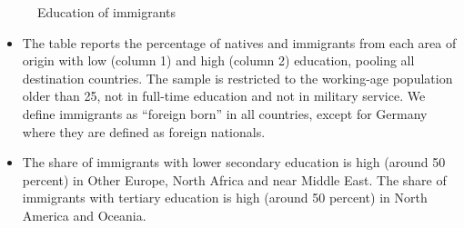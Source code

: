 \begin{itemize}
\begin{figure}[H]
                \caption{Education of immigrants}
            \end{figure}
    \begin{itemize}
         \item The table reports the percentage of natives and immigrants from each area of origin with low (column 1) and high (column 2) education, pooling all destination countries. The sample is restricted to the working-age population older than 25, not in full-time education and not in military service. We define 
immigrants as “foreign born” in all countries, except for Germany where they are defined as foreign nationals.
         \item The share of immigrants with lower secondary education is high (around 50 percent) in Other Europe,  North Africa and near Middle East. The share of immigrants with tertiary education is high (around 50 percent) in North America and Oceania.
\end{itemize}
         
\end{itemize}


